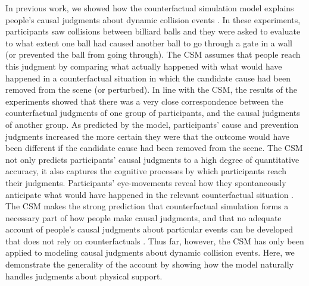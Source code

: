 \documentclass[10pt, letterpaper]{article}
\begin{document}
In previous work, we showed how the counterfactual simulation model explains people's causal judgments about dynamic collision events \citep{gerstenberg2012noisy,gerstenberg2014simulation,gerstenberg2015how,gerstenberg2016almost}. In these experiments, participants saw collisions between billiard balls and they were asked to evaluate to what extent one ball had caused another ball to go through a gate in a wall (or prevented the ball from going through). The CSM assumes that people reach this judgment by comparing what actually happened with what would have happened in a counterfactual situation in which the candidate cause had been removed from the scene (or perturbed). In line with the CSM, the results of the experiments showed that there was a very close correspondence between the counterfactual judgments of one group of participants, and the causal judgments of another group. As predicted by the model, participants' cause and prevention judgments increased the more certain they were that the outcome would have been different if the candidate cause had been removed from the scene. The CSM not only predicts participants' causal judgments to a high degree of quantitative accuracy, it also captures the cognitive processes by which participants reach their judgments. Participants' eye-movements reveal how they spontaneously anticipate what would have happened in the relevant counterfactual situation \citep{gerstenberg2016tracking}. The CSM makes the strong prediction that counterfactual simulation forms a necessary part of how people make causal judgments, and that no adequate account of people's causal judgments about particular events can be developed that does not rely on counterfactuals \citep[cf.][]{wolff2007representing}. Thus far, however, the CSM has only been applied to modeling causal judgments about dynamic collision events. Here, we demonstrate the generality of the account by showing how the model naturally handles judgments about physical support. 

\end{document}
